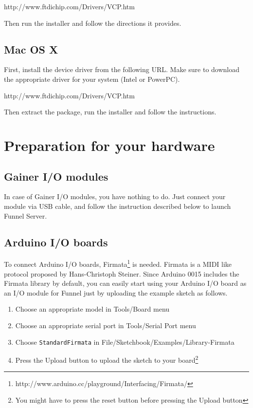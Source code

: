 \documentclass[9pt]{jsarticle}
\begin{document}
\vspace{8pt}
http://www.ftdichip.com/Drivers/VCP.htm
\vspace{8pt}

Then run the installer and follow the directions it provides.

\subsection{Mac OS X}
First, install the device driver from the following URL. Make sure to download the appropriate driver for your system (Intel or PowerPC).

\vspace{8pt}
http://www.ftdichip.com/Drivers/VCP.htm
\vspace{8pt}

Then extract the package, run the installer and follow the instructions.

\section{Preparation for your hardware}
\subsection{Gainer I/O modules}
In case of Gainer I/O modules, you have nothing to do. Just connect your module via USB cable, and follow the instruction described below to launch Funnel Server.

\subsection{Arduino I/O boards}
\label{uploading_firmata_arduino}
To connect Arduino I/O boards, Firmata\footnote{http://www.arduino.cc/playground/Interfacing/Firmata/} is needed. Firmata is a MIDI like protocol proposed by Hans-Christoph Steiner. Since Arduino 0015 includes the Firmata library by default, you can easily start using your Arduino I/O board as an I/O module for Funnel just by uploading the example sketch as follows.

\begin{enumerate}
\item Choose an appropriate model in Tools/Board menu
\item Choose an appropriate serial port in Tools/Serial Port menu
\item Choose \texttt{StandardFirmata} in File/Sketchbook/Examples/Library-Firmata
\item Press the Upload button to upload the sketch to your board\footnote{You might have to press the reset button before pressing the Upload button}
\end{enumerate}
\end{document}
